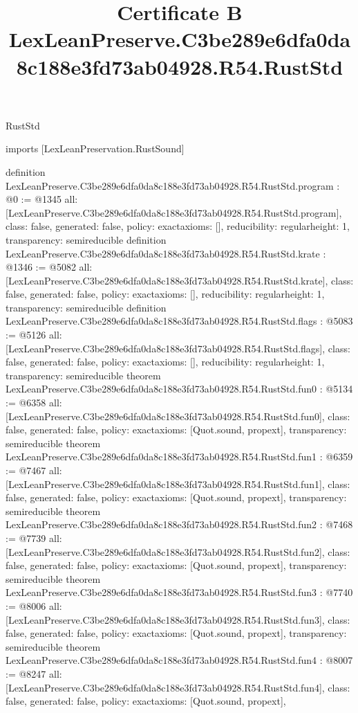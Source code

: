 \begin{lexlean}{RustStd}
\title{Certificate B LexLeanPreserve.C3be289e6dfa0da8c188e3fd73ab04928.R54.RustStd}
\begin{coremodule}
imports [LexLeanPreservation.RustSound]

definition LexLeanPreserve.C3be289e6dfa0da8c188e3fd73ab04928.R54.RustStd.program : @0 := @1345 {
  all: [LexLeanPreserve.C3be289e6dfa0da8c188e3fd73ab04928.R54.RustStd.program],
  class: false,
  generated: false,
  policy: exact{axioms: []},
  reducibility: regular{height: 1},
  transparency: semireducible
}
definition LexLeanPreserve.C3be289e6dfa0da8c188e3fd73ab04928.R54.RustStd.krate : @1346 := @5082 {
  all: [LexLeanPreserve.C3be289e6dfa0da8c188e3fd73ab04928.R54.RustStd.krate],
  class: false,
  generated: false,
  policy: exact{axioms: []},
  reducibility: regular{height: 1},
  transparency: semireducible
}
definition LexLeanPreserve.C3be289e6dfa0da8c188e3fd73ab04928.R54.RustStd.flags : @5083 := @5126 {
  all: [LexLeanPreserve.C3be289e6dfa0da8c188e3fd73ab04928.R54.RustStd.flags],
  class: false,
  generated: false,
  policy: exact{axioms: []},
  reducibility: regular{height: 1},
  transparency: semireducible
}
theorem LexLeanPreserve.C3be289e6dfa0da8c188e3fd73ab04928.R54.RustStd.fun0 : @5134 := @6358 {
  all: [LexLeanPreserve.C3be289e6dfa0da8c188e3fd73ab04928.R54.RustStd.fun0],
  class: false,
  generated: false,
  policy: exact{axioms: [Quot.sound, propext]},
  transparency: semireducible
}
theorem LexLeanPreserve.C3be289e6dfa0da8c188e3fd73ab04928.R54.RustStd.fun1 : @6359 := @7467 {
  all: [LexLeanPreserve.C3be289e6dfa0da8c188e3fd73ab04928.R54.RustStd.fun1],
  class: false,
  generated: false,
  policy: exact{axioms: [Quot.sound, propext]},
  transparency: semireducible
}
theorem LexLeanPreserve.C3be289e6dfa0da8c188e3fd73ab04928.R54.RustStd.fun2 : @7468 := @7739 {
  all: [LexLeanPreserve.C3be289e6dfa0da8c188e3fd73ab04928.R54.RustStd.fun2],
  class: false,
  generated: false,
  policy: exact{axioms: [Quot.sound, propext]},
  transparency: semireducible
}
theorem LexLeanPreserve.C3be289e6dfa0da8c188e3fd73ab04928.R54.RustStd.fun3 : @7740 := @8006 {
  all: [LexLeanPreserve.C3be289e6dfa0da8c188e3fd73ab04928.R54.RustStd.fun3],
  class: false,
  generated: false,
  policy: exact{axioms: [Quot.sound, propext]},
  transparency: semireducible
}
theorem LexLeanPreserve.C3be289e6dfa0da8c188e3fd73ab04928.R54.RustStd.fun4 : @8007 := @8247 {
  all: [LexLeanPreserve.C3be289e6dfa0da8c188e3fd73ab04928.R54.RustStd.fun4],
  class: false,
  generated: false,
  policy: exact{axioms: [Quot.sound, propext]},
}
\end{coremodule}
\end{lexlean}
